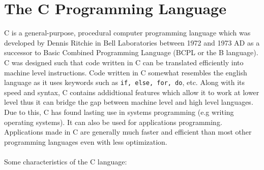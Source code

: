 \documentclass[report]{subfiles}
\begin{document}
    \section{The C Programming Language}
    C is a general-purpose, procedural computer programming language which was developed by Dennis Ritchie in Bell Laboratories between 1972 and 1973 AD as a successor to Basic Combined Programming Language (BCPL or the B language).
    C was designed such that code written in C can be translated efficiently into machine level instructions. 
    Code written in C somewhat resembles the english language as it uses keywords such as \texttt{if, else, for, do}, etc.
    Along with its speed and syntax, C contains addidtional features which allow it to work at lower level thus it can bridge the gap between machine level and high level languages.
    Due to this, C has found lasting use in systems programming (e.g writing operating systems). 
    It can also be used for applications programming. Applications made in C are generally much faster and efficient than most other programming languages even with less optimization.
    \\\\
    Some characteristics of the C language:
\end{document}
